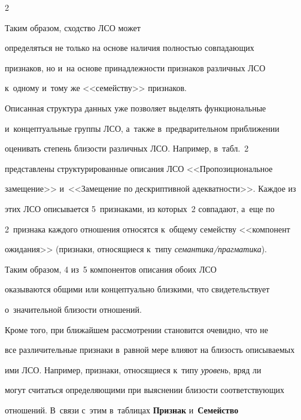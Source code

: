 \begin{multicols}{2}


 Таким образом, сходство ЛСО может 


определяться не только на основе наличия пол\-ностью совпадающих 


признаков, но и~на основе принадлежности признаков различных ЛСО 


к~одному и~тому же <<семейству>> признаков.


   


   Описанная структура данных уже позволяет выделять функциональные 


   и~концептуальные группы ЛСО, а~так\-же в~предварительном при\-бли\-же\-нии 


оценивать степень бли\-зости различных ЛСО. Например, в~табл.~2 


представлены структурированные описания ЛСО <<Пропозициональное 


замещение>> и~<<Замещение по дескриптивной аде\-кват\-ности>>. Каждое из 


этих ЛСО описывается 5~признаками, из которых~2 совпадают, а~еще по 


2~признака каж\-до\-го отношения относятся к~общему семейству <<компонент 


ожидания>> (признаки, относящиеся к~типу \textit{се\-ман\-ти\-ка/праг\-ма\-ти\-ка}). 


Таким образом, 4 из~5 компонентов описания обоих ЛСО 


оказываются общими или концептуально близ\-ки\-ми, что свидетельствует 


о~значительной бли\-зости от\-но\-ше\-ний.


{





}


   


   Кроме того, при ближайшем рассмотрении становится очевидно, что не 


все различительные признаки в~равной мере влияют на близость опи\-сы\-ва\-емых 


ими ЛСО. Например, признаки, относящиеся к~типу \textit{уровень}, вряд ли 


могут считаться определяющими при выяснении близости соответствующих 


отношений. В~связи с~этим в~таблицах \textbf{Признак} и~\textbf{Семейство} 



\end{multicols}
